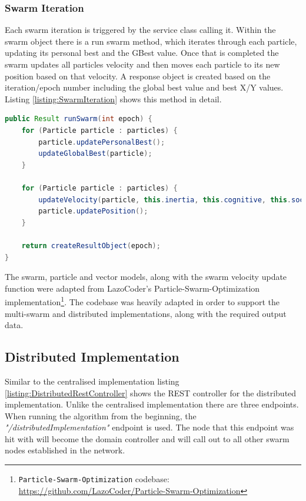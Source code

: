 \documentclass[oneside,12pt]{book}
\begin{document}
\subsubsection{Swarm Iteration}
Each swarm iteration is triggered by the service class calling it. Within the swarm object there is a run swarm method, which iterates through each particle, updating its personal best and the GBest value. Once that is completed the swarm updates all particles velocity and then moves each particle to its new position based on that velocity. A response object is created based on the iteration/epoch number including the global best value and best X/Y values. Listing \ref{listing:SwarmIteration} shows this method in detail. 
\begin{lstlisting}[basicstyle=\footnotesize, language=Java]
public Result runSwarm(int epoch) {
    for (Particle particle : particles) {
        particle.updatePersonalBest();
        updateGlobalBest(particle);
    }

    for (Particle particle : particles) {
        updateVelocity(particle, this.inertia, this.cognitive, this.social);
        particle.updatePosition();
    }

    return createResultObject(epoch);
}
\end{lstlisting}
\label{listing:SwarmIteration}

The swarm, particle and vector models, along with the swarm velocity update function were adapted from LazoCoder's Particle-Swarm-Optimization implementation\footnote{\texttt{Particle-Swarm-Optimization} codebase: \url{https://github.com/LazoCoder/Particle-Swarm-Optimization}}. The codebase was heavily adapted in order to support the multi-swarm and distributed implementations, along with the required output data. 

\subsection{Distributed Implementation}
Similar to the centralised implementation listing \ref{listing:DistributedRestController} shows the REST controller for the distributed implementation. Unlike the centralised implementation there are three endpoints. When running the algorithm from the beginning, the \textit{"/distributedImplementation"} endpoint is used. The node that this endpoint was hit with will become the domain controller and will call out to all other swarm nodes established in the network.
\end{document}
